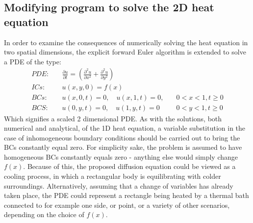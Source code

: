\documentclass[%
oneside,                 %
final,                   %
10pt]{article}
\begin{document}
\subsection{Modifying program to solve the 2D heat equation}
\label{M.2dmod}
In order to examine the consequences of numerically solving the heat equation in two spatial dimensions, the explicit forward Euler algorithm is extended to solve a PDE of the type:
\begin{align}
PDE:& \quad \frac{\partial u}{\partial t}=\left(\frac{\partial^2 u}{\partial x^2}+\frac{\partial^2 u}{\partial y^2}\right) \label{eq:2DPDE}\\
ICs:& \quad u(x,y,0)=f(x) \label{eq:2DIC} \\
BCs:& \quad u(x,0,t)=0, \quad u(x,1,t)=0, \label{eq:2DBC1} \quad &0<x<1,t\geq 0\\
BCS:& \quad u(0,y,t)=0,\quad u(1,y,t)=0 \quad &0<y<1, t\geq 0 \label{eq:2DBC2}
\end{align}
Which signifies a scaled 2 dimensional PDE. As with the solutions, both numerical and analytical, of the 1D heat equation, a variable substitution in the case of inhomogeneous boundary conditions should be carried out to bring the BCs constantly equal zero. For simplicity sake, the problem is assumed to have homogeneous BCs constantly equals zero - anything else would simply change $f(x)$. Because of this, the proposed diffusion equation could be viewed as a cooling process, in which a rectangular body is equilibrating with colder surroundings. Alternatively, assuming that a change of variables has already taken place, the PDE could represent a rectangle being heated by a thermal bath connected to for example one side, or point, or a variety of other scenarios, depending on the choice of $f(x)$.  \newline
\end{document}
